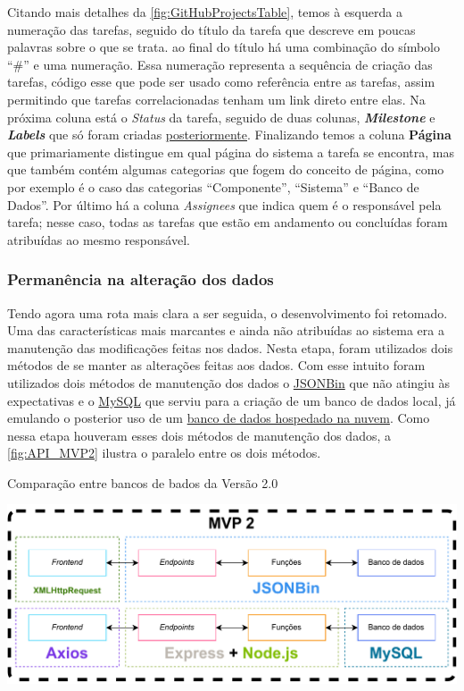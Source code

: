 Citando mais detalhes da \autoref{fig:GitHubProjectsTable}, temos à esquerda a numeração das tarefas, seguido do título da tarefa que descreve em poucas palavras sobre o que se trata. ao final do título há uma combinação do símbolo ``\#'' e uma numeração. Essa numeração representa a sequência de criação das tarefas, código esse que pode ser usado como referência entre as tarefas, assim permitindo que tarefas correlacionadas tenham um link direto entre elas. Na próxima coluna está o \textit{Status} da tarefa, seguido de duas colunas, \textbf{\textit{Milestone}} e \textbf{\textit{Labels}} que só foram criadas \hyperref[ssssec:Marcos e Etiquetas]{posteriormente}. Finalizando temos a coluna \textbf{Página} que primariamente distingue em qual página do sistema a tarefa se encontra, mas que também contém algumas categorias que fogem do conceito de página, como por exemplo é o caso das categorias ``Componente'', ``Sistema'' e ``Banco de Dados''. Por último há a coluna \textit{Assignees} que indica quem é o responsável pela tarefa; nesse caso, todas as tarefas que estão em andamento ou concluídas foram atribuídas ao mesmo responsável.

\subsubsection*{Permanência na alteração dos dados} \label{sssec:Permanência dos Dados}

Tendo agora uma rota mais clara a ser seguida, o desenvolvimento foi retomado. Uma das características mais marcantes e ainda não atribuídas ao sistema era a manutenção das modificações feitas nos dados. Nesta etapa, foram utilizados dois métodos de se manter as alterações feitas aos dados. Com esse intuito foram utilizados dois métodos de manutenção dos dados o \hyperref[ssssec:JSONBin]{JSONBin} que não atingiu às expectativas e o \hyperref[ssssec:MySQL]{MySQL} que serviu para a criação de um banco de dados local, já emulando o posterior uso de um \hyperref[sssec:Amazon Web Services]{banco de dados hospedado na nuvem}. Como nessa etapa houveram esses dois métodos de manutenção dos dados, a \autoref{fig:API_MVP2} ilustra o paralelo entre os dois métodos.

\begin{MyCenteredFigure} \caption{Comparação entre bancos de bados da Versão 2.0} \label{fig:API_MVP2}
  \includegraphics[width=\textwidth]{files/img/2.02!5-desenvolvimento/2.02!5.1.4-sistema/diagramas/API/API_MVP2}
\end{MyCenteredFigure}

